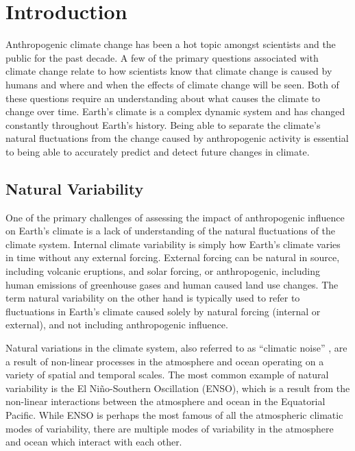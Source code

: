 \graphicspath{{figures/chapter-intro/}} %


\chapter{Introduction}
\label{cha:intro}


Anthropogenic climate change has been a hot topic amongst scientists and the public
for the past decade. A few of the primary questions associated with climate change
relate to how scientists know that climate change is caused by humans and where
and when the effects of climate change will be seen. Both of these questions require
an understanding about what causes the climate to change over time. Earth's climate
is a complex dynamic system and has changed constantly throughout Earth's history.
Being able to separate the climate's natural fluctuations from the change caused by
anthropogenic activity is essential to being able to accurately predict and detect
future changes in climate.

\section{Natural Variability}

One of the primary challenges of assessing the impact of anthropogenic influence
on Earth's climate is a lack of understanding of the natural fluctuations of the
climate system. Internal climate variability is simply how Earth's climate varies
in time without any external forcing. External forcing can be natural in source,
including volcanic eruptions, and solar forcing, or anthropogenic, including
human emissions of greenhouse gases and human caused land use changes. The term
natural variability on the other hand is typically used to refer to fluctuations
in Earth's climate caused solely by natural forcing (internal or external), and
not including anthropogenic influence.

Natural variations in the climate system, also referred to as ``climatic noise''
\citep{Madden1976a,Schneider1994,Wunsch1999,Feldstein2000},
are a result of non-linear processes in the atmosphere
and ocean operating on a variety of spatial and temporal scales. The most common
example of natural variability is the El Ni\~no-Southern Oscillation (ENSO),
which is a result from the non-linear interactions between the atmosphere and
ocean in the Equatorial Pacific. While ENSO is perhaps the most famous of all the
atmospheric climatic modes of variability, there are multiple modes of variability
in the atmosphere and ocean which interact with each other.

